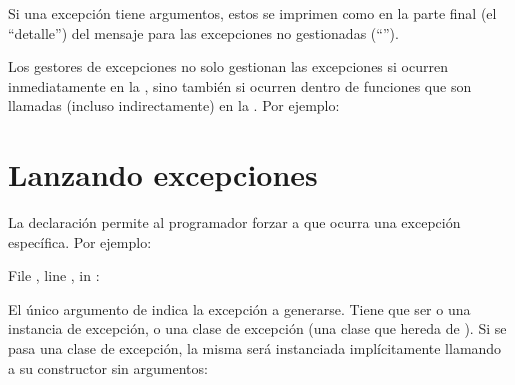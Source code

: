 \documentclass[a4,10pt,spanish]{sphinxmanual}
\begin{document}
\sphinxAtStartPar
Si una excepción tiene argumentos, estos se imprimen como en la parte final (el “detalle”) del mensaje para las excepciones no gestionadas (“”).

\sphinxAtStartPar
Los gestores de excepciones no solo gestionan las excepciones si ocurren inmediatamente en la , sino también si ocurren dentro de funciones que son llamadas (incluso indirectamente) en la . Por ejemplo:

\begin{sphinxVerbatim}[commandchars=\\\{\}]
 
      
    
   
     
\end{sphinxVerbatim}


\section{Lanzando excepciones}
\label{\detokenize{tutorial/errors:raising-exceptions}}\label{\detokenize{tutorial/errors:tut-raising}}
\sphinxAtStartPar
La declaración  permite al programador forzar a que ocurra una excepción específica.  Por ejemplo:

\begin{sphinxVerbatim}[commandchars=\\\{\}]
 
  File , line , in 
: 
\end{sphinxVerbatim}

\sphinxAtStartPar
El único argumento de  indica la excepción a generarse. Tiene que ser o una instancia de excepción, o una clase de excepción (una clase que hereda de ). Si se pasa una clase de excepción, la misma será instanciada implícitamente llamando a su constructor sin argumentos:
\end{document}
